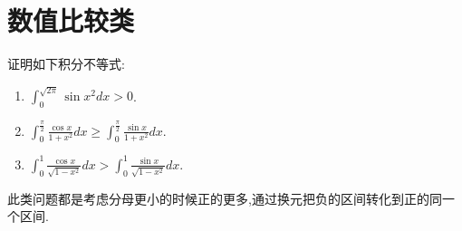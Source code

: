 \documentclass[../../main.tex]{subfiles}
\begin{document}
\section{数值比较类}

\begin{example}
证明如下积分不等式:
\begin{enumerate}
\item $\int_{0}^{\sqrt{2\pi}} \sin x^{2}dx > 0$.

\item $\int_{0}^{\frac{\pi}{2}} \frac{\cos x}{1 + x^{2}}dx \geqslant \int_{0}^{\frac{\pi}{2}} \frac{\sin x}{1 + x^{2}}dx.$

\item $\int_{0}^{1} \frac{\cos x}{\sqrt{1 - x^{2}}}dx > \int_{0}^{1} \frac{\sin x}{\sqrt{1 - x^{2}}}dx.$
\end{enumerate}
\end{example}
\begin{note}
此类问题都是考虑分母更小的时候正的更多,通过换元把负的区间转化到正的同一个区间.
\end{note}
\end{document}
